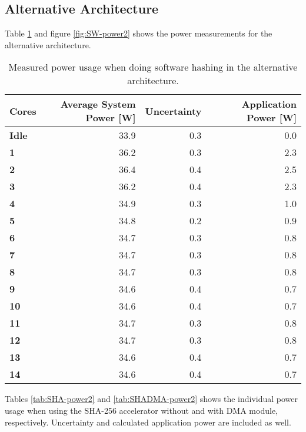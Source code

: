 \begin{appendix}
\subsection{Alternative Architecture}

Table \ref{tab:SW-power2} and figure \ref{fig:SW-power2} shows the power measurements for the alternative architecture.

\begin{table}
\centering
\begin{tabular}{| l | r | r || r |}
  \hline 
  \textbf{Cores} & \textbf{Average System Power [W]} & \textbf{Uncertainty} & \textbf{Application Power [W]} \\
  \hline                         
  \textbf{Idle} & 33.9 & 0.3 & 0.0\\
  \textbf{1} & 36.2 & 0.3 & 2.3\\
  \textbf{2} & 36.4 & 0.4 & 2.5\\
  \textbf{3} & 36.2 & 0.4 & 2.3\\
  \textbf{4} & 34.9 & 0.3 & 1.0\\
  \textbf{5} & 34.8 & 0.2 & 0.9\\
  \textbf{6} & 34.7 & 0.3 & 0.8\\
  \textbf{7} & 34.7 & 0.3 & 0.8\\
  \textbf{8} & 34.7 & 0.3 & 0.8\\
  \textbf{9} & 34.6 & 0.4 & 0.7\\
  \textbf{10} & 34.6 & 0.4 & 0.7\\
  \textbf{11} & 34.7 & 0.3 & 0.8\\
  \textbf{12} & 34.7 & 0.3 & 0.8\\
  \textbf{13} & 34.6 & 0.4 & 0.7\\
  \textbf{14} & 34.6 & 0.4 & 0.7\\
  \hline 
\end{tabular}
\caption{Measured power usage when doing software hashing in the alternative architecture.}
\label{tab:SW-power2}
\end{table}

Tables \ref{tab:SHA-power2} and \ref{tab:SHADMA-power2} shows the individual power usage when using the SHA-256 accelerator without and with DMA module, respectively. 
Uncertainty and calculated application power are included as well.


\end{appendix}
